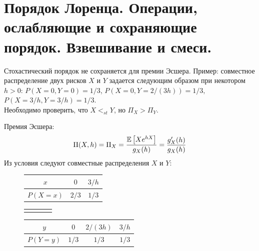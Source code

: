 \chapter{Порядок Лоренца. Операции, ослабляющие и сохраняющие порядок. Взвешивание и смеси.}
\problem{} 
Стохастический порядок не сохраняется для премии Эсшера. Пример: совместное распределение двух рисков $X$ и $Y$ задается следующим образом при некотором $h > 0$:
$P(X = 0, Y = 0) = 1/3$, $P(X = 0, Y = 2/(3h)) = 1/3,$
$P(X = 3/h, Y = 3/h) = 1/3$.\\
Необходимо проверить, что $X <_{st} Y$, но $\Pi_X > \Pi_Y $.

\solution{}
    Премия Эсшера:
    \begin{equation}
        \Pi(X, h) = \Pi_X = \frac{\mathbb{E}\left[Xe^{hX}\right]}{g_X(h)} =  \frac{g'_X(h)}{g_X(h)}
    \end{equation}
    Из условия следуют совместные распределения $X$ и $Y$:
    \begin{figure}[htbp]\label{hw07:task1tab1}
        \begin{tabular}{|c|c|c|}\hline
            $x$ & $0$ & $3/h$ \\\hline
            $P(X = x)$ & $2/3$& $1/3$  \\\hline
        \end{tabular}
        \begin{tabular}{cccc}
            &&&
        \end{tabular}
        \begin{tabular}{|c|c|c|c|}\hline
            $y$ & $0$ & $2/(3h)$ & $3/h$ \\\hline
            $P(Y = y)$ & $1/3$ &$1/3$&$1/3$\\\hline
        \end{tabular}
    \end{figure}

